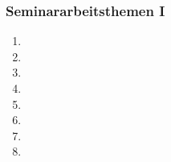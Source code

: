 %
%
%
\begin{frame}
\frametitle{Seminararbeitsthemen I}
\begin{enumerate}[<+->]
\item
\item
\item
\item 
\item
\item
\item
\item
\end{enumerate}
\end{frame}

